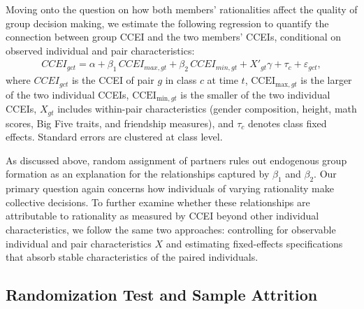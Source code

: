 \documentclass[11 pt]{article}
\begin{document}
Moving onto the question on how both members' rationalities affect the quality of group decision making,  we estimate the following regression to quantify the connection between group CCEI and the two members' CCEIs, conditional on observed individual and pair characteristics:
\begin{align}\label{eqn:CCEI_reg}
CCEI_{gct} = \alpha + \beta_1\, CCEI_{max,gt} + \beta_2\, CCEI_{min,gt} +  X'_{gt}\gamma + \tau_c + \varepsilon_{gct},
\end{align}
where $CCEI_{gct}$ is the CCEI of pair $g$ in class $c$ at time $t$, $\text{CCEI}_{\text{max},gt}$ is the larger of the two individual CCEIs, $\text{CCEI}_{\text{min},gt}$ is the smaller of the two individual CCEIs, $X_{gt}$ includes within-pair characteristics (gender composition, height, math scores, Big Five traits, and friendship measures), and $\tau_c$ denotes class fixed effects. Standard errors are clustered at class level.

As discussed above, random assignment of partners rules out endogenous group formation as an explanation for the relationships captured by $\beta_1$ and $\beta_2$. Our primary question again concerns how individuals of varying rationality make collective decisions. To further examine whether these relationships are attributable to rationality as measured by CCEI beyond other individual characteristics, we follow the same two approaches: controlling for observable individual and pair characteristics $X$ and estimating fixed-effects specifications that absorb stable characteristics of the paired individuals.

\subsection{Randomization Test and Sample Attrition}
\end{document}
